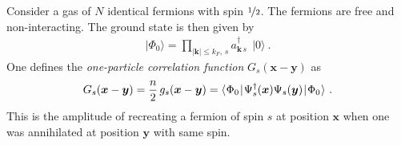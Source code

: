 \documentclass[11pt,a4paper]{article}
\newcommand{\abs}[1]{\lvert#1\rvert}
\newcommand{\ket}[1]{\lvert#1\rangle}
\newcommand{\matrixel}[3]{\langle\hspace{0.15mm}#1\hspace{0.25mm}\vert\hspace{0.25mm} #2 \hspace{0.25mm}\vert\hspace{0.25mm}#3\hspace{0.15mm}\rangle}
\newcommand{\boldx}{{\boldsymbol x}}
\newcommand{\boldy}{{\boldsymbol y}}
\newcommand{\boldk}{{\boldsymbol k}}
\begin{document}
Consider a gas of $N$ identical fermions with spin $\nicefrac{1}{2}$. The fermions are free and non-interacting.
The ground state is then given by
\begin{align}
  \ket{\Phi_0} = \prod_{\abs\boldk\leqslant k_F,\,s}\!\!\!\! a_{\boldk\,s}^\dagger\:\ \ket0\ .
\end{align}
One defines the {\em one-particle correlation function} $G_s(\boldx-\boldy)$ as
\begin{align}
  \label{eq:TwoPointCorrFunc}
  G_s(\boldx-\boldy) = \frac{n}{2}\,g_s(\boldx-\boldy)
  = \matrixel{\Phi_0}{\Psi_s^\dagger(\boldx)\Psi_s(\boldy)}{\Phi_0}\ .
\end{align}
This is the amplitude of recreating a fermion of spin $s$ at position $\boldx$ when one was annihilated
at position $\boldy$ with same spin.
\end{document}
